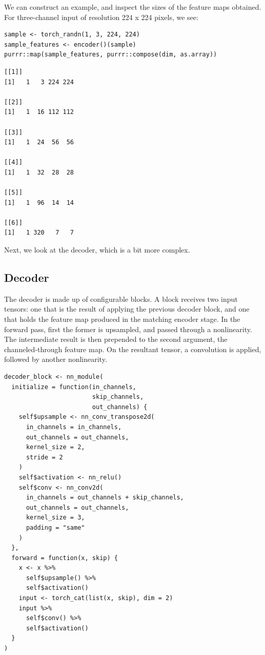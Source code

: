 \documentclass[
  letterpaper,
]{krantz}
\begin{document}
We can construct an example, and inspect the sizes of the feature maps
obtained. For three-channel input of resolution 224 x 224 pixels, we
see:

\begin{verbatim}
sample <- torch_randn(1, 3, 224, 224)
sample_features <- encoder()(sample)
purrr::map(sample_features, purrr::compose(dim, as.array))
\end{verbatim}

\begin{verbatim}
[[1]]
[1]   1   3 224 224

[[2]]
[1]   1  16 112 112

[[3]]
[1]   1  24  56  56

[[4]]
[1]   1  32  28  28

[[5]]
[1]   1  96  14  14

[[6]]
[1]   1 320   7   7
\end{verbatim}

Next, we look at the decoder, which is a bit more complex.

\hypertarget{decoder}{%
\subsection{Decoder}\label{decoder}}

The decoder is made up of configurable blocks. A block receives two
input tensors: one that is the result of applying the previous decoder
block, and one that holds the feature map produced in the matching
encoder stage. In the forward pass, first the former is upsampled, and
passed through a nonlinearity. The intermediate result is then prepended
to the second argument, the channeled-through feature map. On the
resultant tensor, a convolution is applied, followed by another
nonlinearity.

\begin{verbatim}
decoder_block <- nn_module(
  initialize = function(in_channels,
                        skip_channels,
                        out_channels) {
    self$upsample <- nn_conv_transpose2d(
      in_channels = in_channels,
      out_channels = out_channels,
      kernel_size = 2,
      stride = 2
    )
    self$activation <- nn_relu()
    self$conv <- nn_conv2d(
      in_channels = out_channels + skip_channels,
      out_channels = out_channels,
      kernel_size = 3,
      padding = "same"
    )
  },
  forward = function(x, skip) {
    x <- x %>%
      self$upsample() %>%
      self$activation()
    input <- torch_cat(list(x, skip), dim = 2)
    input %>%
      self$conv() %>%
      self$activation()
  }
)
\end{verbatim}
\end{document}
